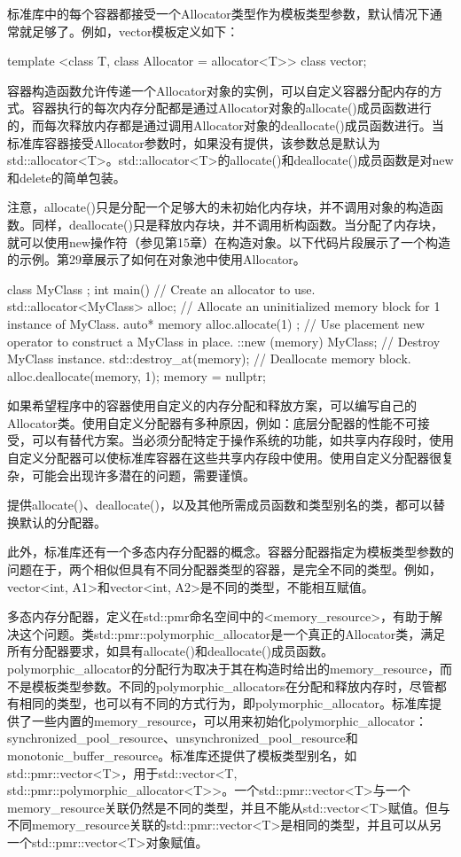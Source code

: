 标准库中的每个容器都接受一个Allocator类型作为模板类型参数，默认情况下通常就足够了。例如，vector模板定义如下：

\begin{cpp}
template <class T, class Allocator = allocator<T>> class vector;
\end{cpp}

容器构造函数允许传递一个Allocator对象的实例，可以自定义容器分配内存的方式。容器执行的每次内存分配都是通过Allocator对象的allocate()成员函数进行的，而每次释放内存都是通过调用Allocator对象的deallocate()成员函数进行。当标准库容器接受Allocator参数时，如果没有提供，该参数总是默认为std::allocator<T>。std::allocator<T>的allocate()和deallocate()成员函数是对new和delete的简单包装。

注意，allocate()只是分配一个足够大的未初始化内存块，并不调用对象的构造函数。同样，deallocate()只是释放内存块，并不调用析构函数。当分配了内存块，就可以使用new操作符（参见第15章）在构造对象。以下代码片段展示了一个构造的示例。第29章展示了如何在对象池中使用Allocator。

\begin{cpp}
class MyClass {};
int main()
{
    // Create an allocator to use.
    std::allocator<MyClass> alloc;
    // Allocate an uninitialized memory block for 1 instance of MyClass.
    auto* memory { alloc.allocate(1) };
    // Use placement new operator to construct a MyClass in place.
    ::new (memory) MyClass{};
    // Destroy MyClass instance.
    std::destroy_at(memory);
    // Deallocate memory block.
    alloc.deallocate(memory, 1);
    memory = nullptr;
}
\end{cpp}

如果希望程序中的容器使用自定义的内存分配和释放方案，可以编写自己的Allocator类。使用自定义分配器有多种原因，例如：底层分配器的性能不可接受，可以有替代方案。当必须分配特定于操作系统的功能，如共享内存段时，使用自定义分配器可以使标准库容器在这些共享内存段中使用。使用自定义分配器很复杂，可能会出现许多潜在的问题，需要谨慎。

提供allocate()、deallocate()，以及其他所需成员函数和类型别名的类，都可以替换默认的分配器。

此外，标准库还有一个多态内存分配器的概念。容器分配器指定为模板类型参数的问题在于，两个相似但具有不同分配器类型的容器，是完全不同的类型。例如，vector<int, A1>和vector<int, A2>是不同的类型，不能相互赋值。

多态内存分配器，定义在std::pmr命名空间中的<memory\_resource>，有助于解决这个问题。类std::pmr::polymorphic\_allocator是一个真正的Allocator类，满足所有分配器要求，如具有allocate()和deallocate()成员函数。polymorphic\_allocator的分配行为取决于其在构造时给出的memory\_resource，而不是模板类型参数。不同的polymorphic\_allocators在分配和释放内存时，尽管都有相同的类型，也可以有不同的方式行为，即polymorphic\_allocator。标准库提供了一些内置的memory\_resource，可以用来初始化polymorphic\_allocator：synchronized\_pool\_resource、unsynchronized\_pool\_resource和monotonic\_buffer\_resource。标准库还提供了模板类型别名，如std::pmr::vector<T>，用于std::vector<T, std::pmr::polymorphic\_allocator<T>{}>。一个std::pmr::vector<T>与一个memory\_resource关联仍然是不同的类型，并且不能从std::vector<T>赋值。但与不同memory\_resource关联的std::pmr::vector<T>是相同的类型，并且可以从另一个std::pmr::vector<T>对象赋值。

